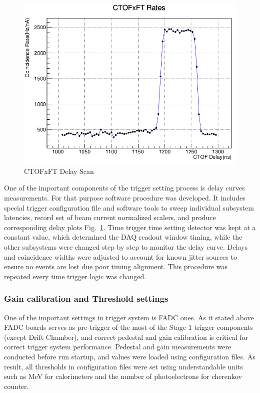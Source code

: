 \begin{figure}[hbt]
	\centering
	\includegraphics[width=1.0\columnwidth,keepaspectratio]{img/delay_scan_ctof_ft.png}
	\caption{CTOFxFT Delay Scan}
	\label{fig:delay_scan_ctof_ft}
\end{figure}

One of the important components of the trigger setting process is delay curves measurements. For that purpose software procedure was developed. It includes special trigger configuration file and software tools to sweep individual subsystem latencies, record set of beam current normalized scalers, and produce corresponding delay plots Fig.~\ref{fig:delay_scan_ctof_ft}. Time trigger time setting detector was kept at a constant value, which determined the DAQ readout window timing, while the other subsystems were changed step by step to monitor the delay curve. Delays and coincidence widths were adjusted to account for known jitter sources to ensure no events are lost due poor timing alignment. This procedure was repeated every time trigger logic was changed.


\subsubsection{Gain calibration and Threshold settings}

One of the important settings in trigger system is FADC ones. As it stated above FADC boards serves as pre-trigger of the most of the Stage 1 trigger components (except Drift Chamber), and correct pedestal and gain calibration is critical for correct trigger system performance. Pedestal and gain measurements were conducted before run startup, and values were loaded using configuration files. As result, all thresholds in configuration files were set using understandable units such as MeV for calorimeters and the number of photoelectrons for cherenkov counter.


